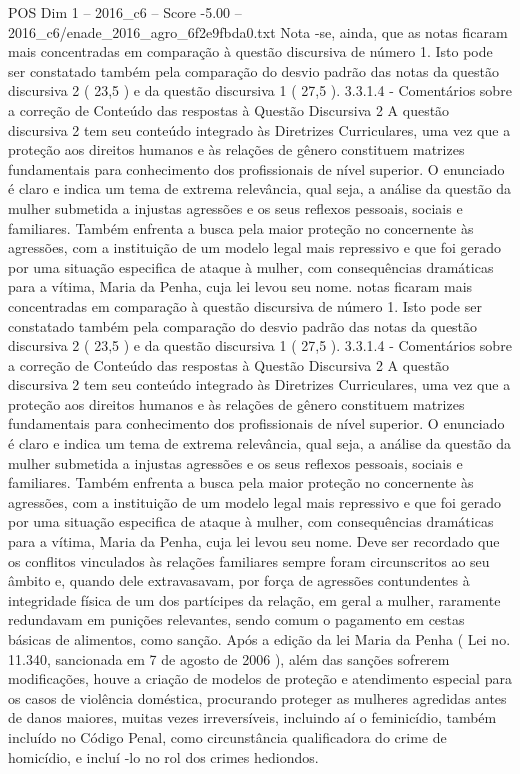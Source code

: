 \begin{textsample}{POS Dim 1 – 2016\_c6 – Score -5.00 – 2016\_c6/enade\_2016\_agro\_6f2e9fbda0.txt}
Nota -se, ainda, que as notas ficaram mais concentradas em comparação à questão discursiva de número 1.
Isto pode ser constatado também pela comparação do desvio padrão das notas da questão discursiva 2 ( 23,5 ) e da questão discursiva 1 ( 27,5 ). 3.3.1.4 - Comentários sobre a correção de Conteúdo das respostas à Questão Discursiva 2 A questão discursiva 2 tem seu conteúdo integrado às Diretrizes Curriculares, uma vez que a proteção aos direitos humanos e às relações de gênero constituem matrizes fundamentais para conhecimento dos profissionais de nível superior.
O enunciado é claro e indica um tema de extrema relevância, qual seja, a análise da questão da mulher submetida a injustas agressões e os seus reflexos pessoais, sociais e familiares.
Também enfrenta a busca pela maior proteção no concernente às agressões, com a instituição de um modelo legal mais repressivo e que foi gerado por uma situação especifica de ataque à mulher, com consequências dramáticas para a vítima, Maria da Penha, cuja lei levou seu nome. notas ficaram mais concentradas em comparação à questão discursiva de número 1.
Isto pode ser constatado também pela comparação do desvio padrão das notas da questão discursiva 2 ( 23,5 ) e da questão discursiva 1 ( 27,5 ). 3.3.1.4 - Comentários sobre a correção de Conteúdo das respostas à Questão Discursiva 2 A questão discursiva 2 tem seu conteúdo integrado às Diretrizes Curriculares, uma vez que a proteção aos direitos humanos e às relações de gênero constituem matrizes fundamentais para conhecimento dos profissionais de nível superior.
O enunciado é claro e indica um tema de extrema relevância, qual seja, a análise da questão da mulher submetida a injustas agressões e os seus reflexos pessoais, sociais e familiares.
Também enfrenta a busca pela maior proteção no concernente às agressões, com a instituição de um modelo legal mais repressivo e que foi gerado por uma situação especifica de ataque à mulher, com consequências dramáticas para a vítima, Maria da Penha, cuja lei levou seu nome.
Deve ser recordado que os conflitos vinculados às relações familiares sempre foram circunscritos ao seu âmbito e, quando dele extravasavam, por força de agressões contundentes à integridade física de um dos partícipes da relação, em geral a mulher, raramente redundavam em punições relevantes, sendo comum o pagamento em cestas básicas de alimentos, como sanção.
Após a edição da lei Maria da Penha ( Lei no. 11.340, sancionada em 7 de agosto de 2006 ), além das sanções sofrerem modificações, houve a criação de modelos de proteção e atendimento especial para os casos de violência doméstica, procurando proteger as mulheres agredidas antes de danos maiores, muitas vezes irreversíveis, incluindo aí o feminicídio, também incluído no Código Penal, como circunstância qualificadora do crime de homicídio, e incluí -lo no rol dos crimes hediondos.

\end{textsample}
